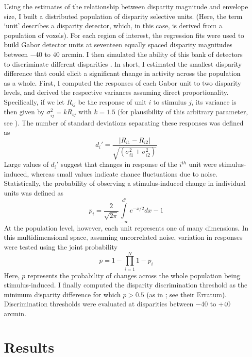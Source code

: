 Using the estimates of the relationship between disparity magnitude and envelope size, I built a distributed population of disparity selective units. (Here, the term `unit' describes a disparity detector, which, in this case, is derived from a population of voxels). For each region of interest, the regression fits were used to build Gabor detector units at seventeen equally spaced disparity magnitudes between $-$40 to 40 arcmin. I then simulated the ability of this bank of detectors to discriminate different disparities \cite{Lehky:1990fk}. In short, I estimated the smallest disparity difference that could elicit a significant change in activity across the population as a whole. First, I computed the responses of each Gabor unit to two disparity levels, and derived the respective variances assuming direct proportionality. Specifically, if we let $R_{ij}$ be the response of unit $i$ to stimulus $j$, its variance is then given by $\sigma_{ij}^2 = kR_{ij}$ with $k = 1.5$ (for plausibility of this arbitrary parameter, see \cite{Lehky:1990fk}). The number of standard deviations separating these responses was defined as 
\begin{equation}
d_i' = \frac{|R_{i1}-R_{i2}|}{\sqrt{(\sigma_{i1}^2+\sigma_{i2}^2)}}
\end{equation}
Large values of $d_i'$ suggest that changes in response of the $i^{th}$ unit were stimulus-induced, whereas small values indicate chance fluctuations due to noise. Statistically, the probability of observing a stimulus-induced change in individual units was defined as
\begin{equation}
p_i=\frac{2}{\sqrt{2\pi}}\int\limits_{-\infty}^{d'}e^{-x/2}dx-1
\end{equation}
At the population level, however, each unit represents one of many dimensions. In this multidimensional space, assuming uncorrelated noise, variation in responses were tested using the joint probability
\begin{equation}
p=1-\prod\limits_{i=1}^N1-p_i
\end{equation}
Here, $p$ represents the probability of changes across the whole population being stimulus-induced. I finally computed the disparity discrimination threshold as the minimum disparity difference for which $p > 0.5$ (as in \cite{Lehky:1990fk}; see their Erratum). Discrimination thresholds were evaluated at disparities between $-$40 to +40 arcmin.

\section{Results}

